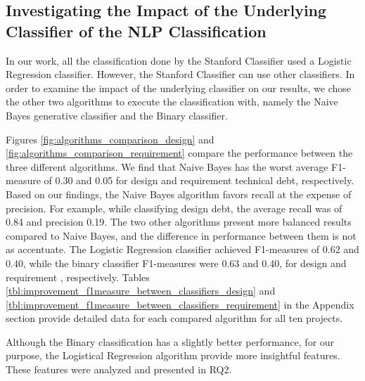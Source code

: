 \subsection{Investigating the Impact of the Underlying Classifier of the NLP Classification}
\label{sec:underlying_classifier}
In our work, all the classification done by the Stanford Classifier used a Logistic Regression classifier. However, the Stanford Classifier can use other classifiers. In order to examine the impact of the underlying classifier on our results, we chose the other two algorithms to execute the classification with, namely the Naive Bayes generative classifier and the Binary classifier.

Figures \ref{fig:algorithms_comparison_design} and \ref{fig:algorithms_comparison_requirement} compare the performance between the three different algorithms. We find that Naive Bayes has the worst average F1-measure of 0.30 and 0.05 for design and requirement technical debt, respectively. Based on our findings, the Naive Bayes algorithm favors recall at the expense of precision. For example, while classifying design debt, the average recall was of 0.84 and precision 0.19. The two other algorithms present more balanced results compared to Naive Bayes, and the difference in performance between them is not as accentuate. The Logistic Regression classifier achieved F1-measures of 0.62 and 0.40, while the binary classifier F1-measures were 0.63 and 0.40, for design and requirement \SATD, respectively. Tables \ref{tbl:improvement_f1measure_between_classifiers_design} and \ref{tbl:improvement_f1measure_between_classifiers_requirement} in the Appendix section provide detailed data for each compared algorithm for all ten projects.

Although the Binary classification has a slightly better performance, for our purpose, the Logistical Regression algorithm provide more insightful features. These features were analyzed and presented in RQ2. 

